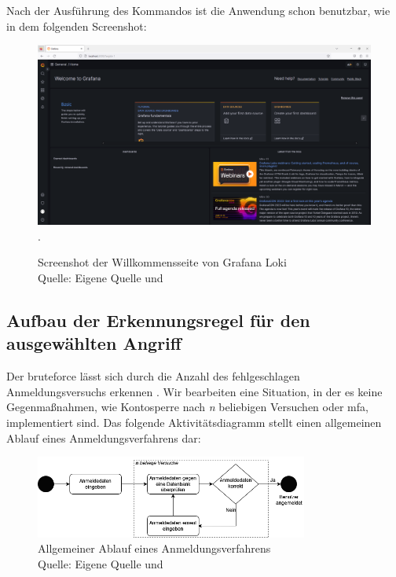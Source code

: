 \newpage
\thispagestyle{lscape}
\begin{landscape}
   Nach der Ausführung des Kommandos ist die Anwendung schon benutzbar, wie in dem folgenden Screenshot:
   \begin{center}
      \begin{figure}[H]
         \centering
         \includegraphics[width=1.3\textwidth]{assets/Installation_Grafana.png}.
         \caption{Screenshot der Willkommensseite von Grafana Loki\\Quelle: Eigene Quelle und \citep{Grafana_Logs}}
         \centering
      \end{figure}
   \end{center}
\end{landscape}

\subsection{Aufbau der Erkennungsregel für den ausgewählten Angriff}
Der \gls{bruteforce} lässt sich durch die Anzahl des fehlgeschlagen Anmeldungsversuchs erkennen \citep{Selvaganesh_SplunkBruteForce}. Wir bearbeiten eine Situation, in der es keine Gegenmaßnahmen, wie Kontosperre nach \textit{n} beliebigen Versuchen oder \gls{mfa}, implementiert sind. Das folgende Aktivitätsdiagramm stellt einen allgemeinen Ablauf eines Anmeldungsverfahrens dar:

\begin{figure}[H]
   \centering
   \includegraphics[width=0.8\textwidth]{assets/Anmeldeverfahren.drawio.png}
   \caption{Allgemeiner Ablauf eines Anmeldungsverfahrens \\Quelle: Eigene Quelle und \citep{Selvaganesh_SplunkBruteForce}}
   \centering
\end{figure}


